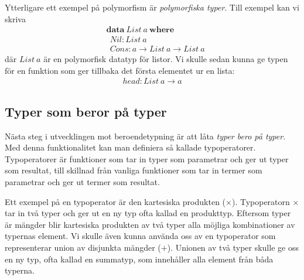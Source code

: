 Ytterligare ett exempel på polymorfism är \emph{polymorfiska typer}. Till
exempel kan vi skriva
\begin{align*}
  &\boldsymbol{data}\ List\ a\ \boldsymbol{where} \\
  &\ \ Nil : List\ a \\
  &\ \ Cons : a \to List\ a \to List\ a
\end{align*}
där $List\ a$ är en polymorfisk datatyp för listor. Vi skulle sedan kunna ge
typen för en funktion som ger tillbaka det första elementet ur en lista:
\begin{align*}
  head : List\ a \to a
\end{align*}

\subsection{Typer som beror på typer}
Nästa steg i utvecklingen mot beroendetypning är att låta \emph{typer bero på
typer}. Med denna funktionalitet kan man definiera så kallade typoperatorer.
Typoperatorer är funktioner som tar in typer som parametrar och ger ut typer
som resultat, till skillnad från vanliga funktioner som tar in termer som
parametrar och ger ut termer som resultat.

Ett exempel på en typoperator är den kartesiska produkten ($\times$).
Typoperatorn $\times$ tar in två typer och ger ut en ny typ ofta kallad en
produkttyp. Eftersom typer är mängder blir kartesiska produkten av två typer
alla möjliga kombinationer av typernas element. Vi skulle även kunna använda
oss av en typoperator som representerar union av disjunkta mängder ($+$).
Unionen av två typer skulle ge oss en ny typ, ofta kallad en summatyp, som
innehåller alla element från båda typerna.

